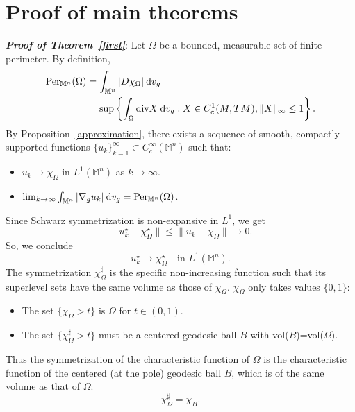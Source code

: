 \documentclass[a4paper,11pt,reqno]{amsart}
\theoremstyle{plain}
\numberwithin{equation}{section} \allowdisplaybreaks
\newcommand{\dvg}{\: {\rm d}v_{g}}
\newcommand{\gradg}{\nabla_g}
\newcommand{\m}{\mathbb{M}^n}
\begin{document}
\medskip

\section{Proof of main theorems}\label{main theorem}

\textit{\textbf{Proof of Theorem~\ref{first}}}: Let $\Omega$ be a bounded, measurable set of finite perimeter. By definition,
\begin{align*}
    \text{Per}_{\m}(\Omega)&= \int_{\m}|D\chi_{\Omega}|\dvg\\
    &=\sup\left\{\int_{\Omega}\text{div}X\dvg: X\in C_c^1(M,TM), \|X\|_{\infty} \leq 1\right\}.
\end{align*}
 By Proposition~\ref{approximation}, there exists a sequence of smooth, compactly supported functions $\{u_k\}_{k=1}^\infty \subset C_c^{\infty}(\m)$ such that:
\begin{itemize}
    \item $u_k \to \chi_{\Omega}$ in $L^1(\m)$ as $k\to \infty$.
    \item $\lim_{k\to \infty} \int_{\m}|\gradg u_k|\dvg=\text{Per}_{\m}(\Omega)$.
\end{itemize}
Since Schwarz symmetrization is non-expansive in $L^1$, we get
\begin{equation*}
    \|u_k^\star-\chi_{\Omega}^\star\| \leq \|u_k-\chi_{\Omega}\| \to 0.
\end{equation*}
So, we conclude 
\begin{equation*}
    u_k^\star \to \chi_{\Omega}^\star \quad\text{in}\,\,L^1(\m).
\end{equation*}
The symmetrization $\chi_{\Omega}^\sharp$ is the specific non-increasing function such that its superlevel sets have the same volume as those of $\chi_{\Omega}$. $\chi_{\Omega}$ only takes values $\{0,1\}$:
\begin{itemize}
    \item The set $\{\chi_{\Omega}>t\}$ is $\Omega$ for $t \in (0,1)$.
    \item The set $\{\chi_{\Omega}^\sharp>t\}$ must be a centered geodesic ball $B$ with vol($B$)=vol($\Omega$).
 \end{itemize}
Thus the symmetrization of the characteristic function of $\Omega$ is the characteristic function of the centered (at the pole) geodesic ball $B$, which is of the same volume as that of $\Omega$:\begin{equation*}
    \chi_{\Omega}^\sharp= \chi_B.
\end{equation*}
\end{document}

